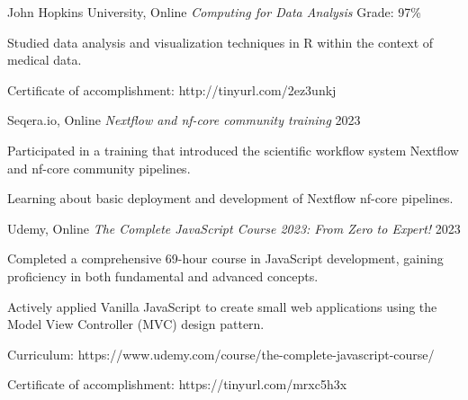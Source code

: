 \begin{cventries}
\cventry
  {John Hopkins University, Online} %
  {\textit{Computing for Data Analysis}} %
  {Grade: 97\%} %
  {} %
  {
    \begin{cvitems} %
      \item {Studied data analysis and visualization techniques in R within the context of medical data.}
      \item {Certificate of accomplishment: http://tinyurl.com/2ez3unkj}
    \end{cvitems}
  }
  \newline

  \cventry
  {Seqera.io, Online} %
  {\textit{Nextflow and nf-core community training}} %
  {} %
  {2023} %
  {
    \begin{cvitems} %
      \item {Participated in a training that introduced the scientific workflow system Nextflow and nf-core community pipelines.}
      \item {Learning about basic deployment and development of Nextflow nf-core pipelines.}
    \end{cvitems}
  }
  \newline


\cventry
  {Udemy, Online} %
  {\textit{The Complete JavaScript Course 2023: From Zero to Expert!}} %
  {} %
  {2023} %
  {
    \begin{cvitems} %
      \item {Completed a comprehensive 69-hour course in JavaScript development, gaining proficiency in both fundamental and advanced concepts.}
      \item {Actively applied Vanilla JavaScript to create small web applications using the Model View Controller (MVC) design pattern.}
      \item {Curriculum: https://www.udemy.com/course/the-complete-javascript-course/}
      \item {Certificate of accomplishment: https://tinyurl.com/mrxc5h3x}
    \end{cvitems}
  }
  \newline


\end{cventries}
